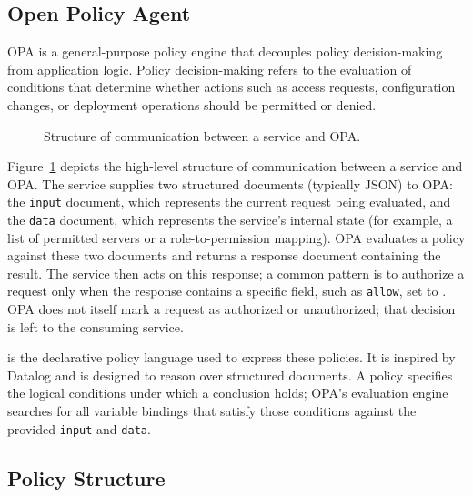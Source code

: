 \subsection{Open Policy Agent}
\label{ssec:opa}

OPA is a general-purpose policy engine that decouples policy decision-making from application logic.
Policy decision-making refers to the evaluation of conditions that determine whether actions such as access requests, configuration changes, or deployment operations should be permitted or denied.

\begin{figure}
    \label{fig:opa-query-graph}
    \centering
    
    \caption{Structure of communication between a service and OPA.}
\end{figure}

Figure~\ref{fig:opa-query-graph} depicts the high-level structure of communication between a service and OPA.
The service supplies two structured documents (typically JSON) to OPA: the \texttt{input} document, which represents the current request being evaluated, and the \texttt{data} document, which represents the service's internal state (for example, a list of permitted servers or a role-to-permission mapping).
OPA evaluates a \rego policy against these two documents and returns a response document containing the result.
The service then acts on this response; a common pattern is to authorize a request only when the response contains a specific field, such as \texttt{allow}, set to \true.
OPA does not itself mark a request as authorized or unauthorized; that decision is left to the consuming service.

\rego is the declarative policy language used to express these policies.
It is inspired by Datalog and is designed to reason over structured documents.
A \rego policy specifies the logical conditions under which a conclusion holds; OPA's evaluation engine searches for all variable bindings that satisfy those conditions against the provided \texttt{input} and \texttt{data}.

\subsection{Policy Structure}
\label{ssec:rego-structure}

